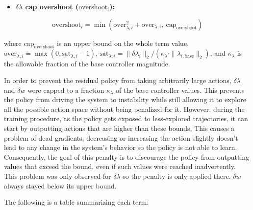 \begin{itemize}
  \item \textbf{$\delta\lambda$ cap overshoot ($\text{overshoot}_i$):}
\end{itemize}

\begin{equation}
  \text{overshoot}_i = \min\left(\text{over}_{\lambda,i}^2 + \text{over}_{\lambda,i}, \ \text{cap}_{\text{overshoot}}\right)
  \label{eq:overshoot-term}
\end{equation}

where $\text{cap}_{\text{overshoot}}$ is an upper bound on the whole
term value, $\text{over}_{\lambda,i} = \max(0, \text{sat}_{\lambda,i} -
1)$, $\text{sat}_{\lambda,i} = \|\delta\lambda_i\|_2 / (\kappa_\lambda
\cdot \|\lambda_{i,\text{base}}\|_2)$, and $\kappa_\lambda$ is the
allowable fraction of the base controller magnitude.

In order to prevent the residual policy from taking arbitrarily large
actions, $\delta\lambda$ and $\delta w$ were capped to a fraction
$\kappa_\lambda$ of the base controller values. This prevents the policy
from driving the system to instability while still allowing it to
explore all the possible action space without being penalized for it.
However, during the training procedure, as the policy gets exposed to
less-explored trajectories, it can start by outputting actions that are
higher than these bounds. This causes a problem of dead gradients;
decreasing or increasing the action slightly doesn’t lead to any change
in the system’s behavior so the policy is not able to learn.
Consequently, the goal of this penalty is to discourage the policy from
outputting values that exceed the bound, even if such values were
reached inadvertently. This problem was only observed for
$\delta\lambda$ so the penalty is only applied there. $\delta w$ always
stayed below its upper bound.

The following is a table summarizing each term:

